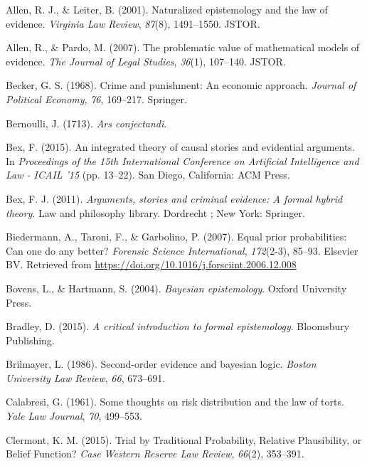 \documentclass[11pt,dvipsnames,enabledeprecatedfontcommands]{scrartcl}
\begin{document}
\leavevmode\hypertarget{ref-allen2001naturalized}{}%
Allen, R. J., \& Leiter, B. (2001). Naturalized epistemology and the law
of evidence. \emph{Virginia Law Review}, \emph{87}(8), 1491--1550.
JSTOR.

\leavevmode\hypertarget{ref-allen2007problematic}{}%
Allen, R., \& Pardo, M. (2007). The problematic value of mathematical
models of evidence. \emph{The Journal of Legal Studies}, \emph{36}(1),
107--140. JSTOR.

\leavevmode\hypertarget{ref-becker1968crime}{}%
Becker, G. S. (1968). Crime and punishment: An economic approach.
\emph{Journal of Political Economy}, \emph{76}, 169--217. Springer.

\leavevmode\hypertarget{ref-Bernoulli1713Ars-conjectandi}{}%
Bernoulli, J. (1713). \emph{Ars conjectandi}.

\leavevmode\hypertarget{ref-bex2015IntegratedTheoryCausal}{}%
Bex, F. (2015). An integrated theory of causal stories and evidential
arguments. In \emph{Proceedings of the 15th International Conference on
Artificial Intelligence and Law - ICAIL '15} (pp. 13--22). San Diego,
California: ACM Press.

\leavevmode\hypertarget{ref-bex2011ArgumentsStoriesCriminal}{}%
Bex, F. J. (2011). \emph{Arguments, stories and criminal evidence: A
formal hybrid theory}. Law and philosophy library. Dordrecht ; New York:
Springer.

\leavevmode\hypertarget{ref-Biedermann2007equal}{}%
Biedermann, A., Taroni, F., \& Garbolino, P. (2007). Equal prior
probabilities: Can one do any better? \emph{Forensic Science
International}, \emph{172}(2-3), 85--93. Elsevier BV. Retrieved from
\url{https://doi.org/10.1016/j.forsciint.2006.12.008}

\leavevmode\hypertarget{ref-bovens2004bayesian}{}%
Bovens, L., \& Hartmann, S. (2004). \emph{Bayesian epistemology}. Oxford
University Press.

\leavevmode\hypertarget{ref-bradley2015critical}{}%
Bradley, D. (2015). \emph{A critical introduction to formal
epistemology}. Bloomsbury Publishing.

\leavevmode\hypertarget{ref-brilmayer1986}{}%
Brilmayer, L. (1986). Second-order evidence and bayesian logic.
\emph{Boston University Law Review}, \emph{66}, 673--691.

\leavevmode\hypertarget{ref-Calabresi1961}{}%
Calabresi, G. (1961). Some thoughts on risk distribution and the law of
torts. \emph{Yale Law Journal}, \emph{70}, 499--553.

\leavevmode\hypertarget{ref-clermont2015TrialTraditionalProbability}{}%
Clermont, K. M. (2015). Trial by Traditional Probability, Relative
Plausibility, or Belief Function? \emph{Case Western Reserve Law
Review}, \emph{66}(2), 353--391.
\end{document}
